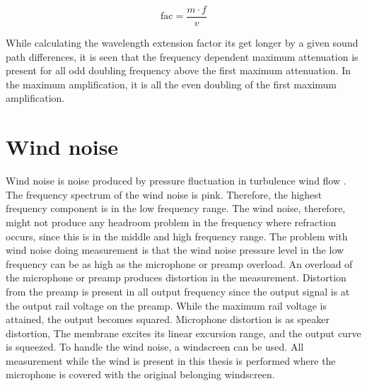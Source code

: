 \begin{equation}\label{pre:fac_wav}
\text{fac} = \frac{m \cdot f}{v}
\end{equation}  

\startexplain
{}
\stopexplain


While calculating the wavelength extension factor its get longer by a given sound path differences, it is seen that the frequency dependent maximum attenuation is present for all odd doubling frequency above the first maximum attenuation. In the maximum amplification, it is all the even doubling of the first maximum amplification.


\section{Wind noise}\label{pre:wind_noise}
Wind noise is noise produced by pressure fluctuation in turbulence wind flow \citep{doi:10.1121/1.4780400}. The frequency spectrum of the wind noise is pink. Therefore, the highest frequency component is in the low frequency range. The wind noise, therefore, might not produce any headroom problem in the frequency where refraction occurs, since this is in the middle and high frequency range. The problem with wind noise doing measurement is that the wind noise pressure level in the low frequency can be as high as the microphone or preamp overload. An overload of the microphone or preamp produces distortion in the measurement. Distortion from the preamp is present in all output frequency since the output signal is at the output rail voltage on the preamp. While the maximum rail voltage is attained, the output becomes squared. Microphone distortion is as speaker distortion, The membrane excites its linear excursion range, and the output curve is squeezed. To handle the wind noise, a windscreen can be used. All measurement while the wind is present in this thesis is performed where the microphone is covered with the original belonging windscreen.  


 